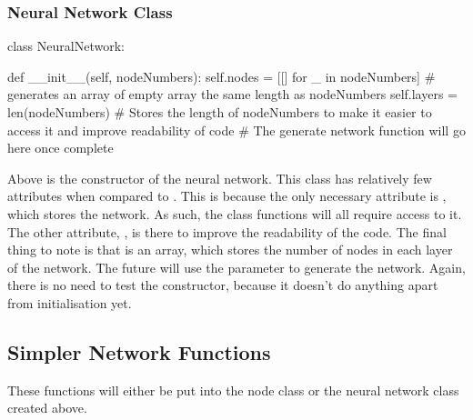 \documentclass{report}
\begin{document}
\subsubsection{Neural Network Class}
\begin{python}
class NeuralNetwork:

        def __init__(self, nodeNumbers):
        self.nodes = [[] for _ in nodeNumbers] # generates an array of empty array the same length as nodeNumbers
        self.layers = len(nodeNumbers) # Stores the length of nodeNumbers to make it easier to access it and improve readability of code
        # The generate network function will go here once complete
\end{python}
Above is the constructor of the neural network. This class has relatively few attributes when compared to . This is because the only necessary attribute is , which stores the network. As such, the class functions will all require access to it. The other attribute, , is there to improve the readability of the code. The final thing to note is that  is an array, which stores the number of nodes in each layer of the network. The future  will use the parameter to generate the network. Again, there is no need to test the constructor, because it doesn't do anything apart from initialisation yet.
\newpage

\subsection{Simpler Network Functions}
These functions will either be put into the node class or the neural network class created above.
\end{document}
